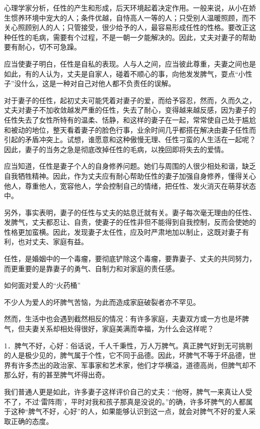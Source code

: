 \documentclass[12pt,UTF8]{ctexbook}
\begin{document}
心理学家分析，任性的产生和形成，后天环境起着决定作用。一般来说，从小在娇生惯养环境中宠大的人；条件优越，自恃高人一等的人；只受别人温暖照顾，而不关心照顾别人的人；只管接受，很少给予的人，最容易形成任性的性格。要改正这种任性的毛病，需要有个过程，不是一朝一夕能解决的。因此，丈夫对妻子的帮助要有耐心，切不可急躁。

应当使妻子明白，任性是自私的表现。人与人之间，应当彼此尊重，夫妻之间也是如此，有的人认为，丈夫是自家人，碰着不顺心的事，向他发发脾气，耍点“小性子”没什么，这是一种对自己对他人都不负责任的误解。

对于妻子的任性，起初丈夫可能凭着对妻子的爱，而给予容忍，然而，久而久之，丈夫对妻子不加收敛越发严重的任性，失去了耐心，变得越来越反感，因为妻子的任性失去了女性所特有的温柔、恬静，和这样的妻子在一起，常常使自己处于尴尬和被动的地位，整天看着妻子的脸色行事，业余时间几乎都搭在解决由妻子任性而引起的矛盾冲突上。试想，谁愿意和这种傲慢无理、任性刁蛮的人生活在一起呢？因此，妻子的当务之急是彻底改掉任性的毛病，以挽回即将失去的爱情。

应当知道，任性是妻子个人的自身修养问题。她们与周围的人很少相处和谐，缺乏自我牺牲精神。因此，作为丈夫应有耐心帮助任性的妻子加强自身修养，懂得关心他人，尊重他人，宽容他人，学会控制自己的情绪，把任性、发火消灭在萌芽状态中。

另外，事实表明，妻子的任性与丈夫的姑息迁就有关。妻子每次毫无理由的任性、发脾气，丈夫都忍让、自责，使妻子的任性非但不能得到自我控制，反而会使她的性格更加蛮横。因此，发现妻子太任性，应及时严肃地加以制止，这既对妻子有利，也对丈夫、家庭有益。

任性，是婚姻中的一个毒瘤，要彻底铲除这个毒瘤，要靠妻子、丈夫的共同努力，而更重要的是靠妻子的勇气、自制力和对家庭的责任感。





如何面对爱人的“火药桶”


不少人为爱人的坏脾气苦恼，为此而造成家庭破裂者亦不罕见。

然而，生活中也会遇到截然相反的情况：有许多家庭，夫妻双方或一方也是坏脾气，但夫妻关系却相处得很好，家庭美满而幸福，为什么会这样呢？

1．脾气不好，心好：俗话说，千人千秉性，万人万脾气。真正脾气好到无可挑剔的人是极少见的，脾气属于个性，它不同于品德。因此，坏脾气不等于坏品德，世界有许多杰出的政治家、军事家和艺术家，他们才华横溢，道德高尚，但脾气却不那么好，有的甚至脾气坏得出奇。

我们普通人更是如此，许多妻子这样评价自己的丈夫：“他呀，脾气一来真让人受不了，不过‘雷阵雨’，平时对我和孩子那真是没说的。”的确，许多坏脾气的人都属于这种“脾气不好，心好”的人，如果能够认识到这一点，就会对脾气不好的爱人采取正确的态度。
\end{document}
